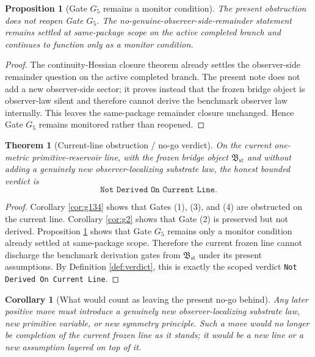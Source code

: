 \documentclass[11pt]{article}
\newcommand{\StableBridgeObject}{\mathfrak B_{\mathrm{st}}}
\newcommand{\GateFive}{G_{5}}
\newtheorem{proposition}{Proposition}
\newtheorem{corollary}{Corollary}
\newtheorem{theorem}{Theorem}
\begin{document}
\begin{proposition}[Gate \(\GateFive\) remains a monitor condition]
\label{prop:g5}
The present obstruction does not reopen Gate \(\GateFive\). The no-genuine-observer-side-remainder statement remains settled at same-package scope on the active completed branch and continues to function only as a monitor condition.
\end{proposition}

\begin{proof}
The continuity-Hessian closure theorem already settles the observer-side remainder question on the active completed branch. The present note does not add a new observer-side sector; it proves instead that the frozen bridge object is observer-law silent and therefore cannot derive the benchmark observer law internally. This leaves the same-package remainder closure unchanged. Hence Gate \(\GateFive\) remains monitored rather than reopened.
\end{proof}

\begin{theorem}[Current-line obstruction / no-go verdict]
\label{thm:verdict}
On the current one-metric primitive-reservoir line, with the frozen bridge object \(\StableBridgeObject\) and without adding a genuinely new observer-localizing substrate law, the honest bounded verdict is
\[
\texttt{Not Derived On Current Line}.
\]
\end{theorem}

\begin{proof}
Corollary \ref{cor:g134} shows that Gates (1), (3), and (4) are obstructed on the current line. Corollary \ref{cor:g2} shows that Gate (2) is preserved but not derived. Proposition \ref{prop:g5} shows that Gate \(\GateFive\) remains only a monitor condition already settled at same-package scope. Therefore the current frozen line cannot discharge the benchmark derivation gates from \(\StableBridgeObject\) under its present assumptions. By Definition \ref{def:verdict}, this is exactly the scoped verdict \texttt{Not Derived On Current Line}.
\end{proof}

\begin{corollary}[What would count as leaving the present no-go behind]
\label{cor:leave}
Any later positive move must introduce a genuinely new observer-localizing substrate law, new primitive variable, or new symmetry principle. Such a move would no longer be completion of the current frozen line as it stands; it would be a new line or a new assumption layered on top of it.
\end{corollary}
\end{document}
